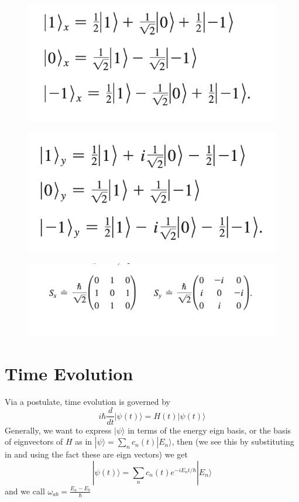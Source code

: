 \documentclass{homework}
\newcommand{\ket}[1]{| #1 \rangle}
\begin{document}
\begin{figure}[htp]
    \centering
    \includegraphics[width=12cm]{Sx}
   

\end{figure}
\begin{figure}[htp]
    \centering
    \includegraphics[width=12cm]{Sy}
   

\end{figure}
\begin{figure}[htp]
    \centering
    \includegraphics[width=12cm]{Sxymatrices}


\end{figure}




\section{Time Evolution}

Via a postulate, time evolution is governed by 
\[i\hbar \frac{d}{dt}\ket{\psi(t)} = H(t)\ket{\psi(t)}\]
Generally, we want to express $\ket{\psi}$ in terms of the energy eign basis, or the basis of eignvectors of $H$ as in $\ket{\psi} = \sum_n c_n(t)\ket{E_n}$, then (we see this by substituting in and using the fact these are eign vectors) we get
\[\ket{\psi(t)} = \sum_n c_n(t)e^{-iE_nt/\hbar}\ket{E_n}\]
and we call $\omega_{ab} = \frac{E_a - E_b}{\hbar}$
\end{document}
